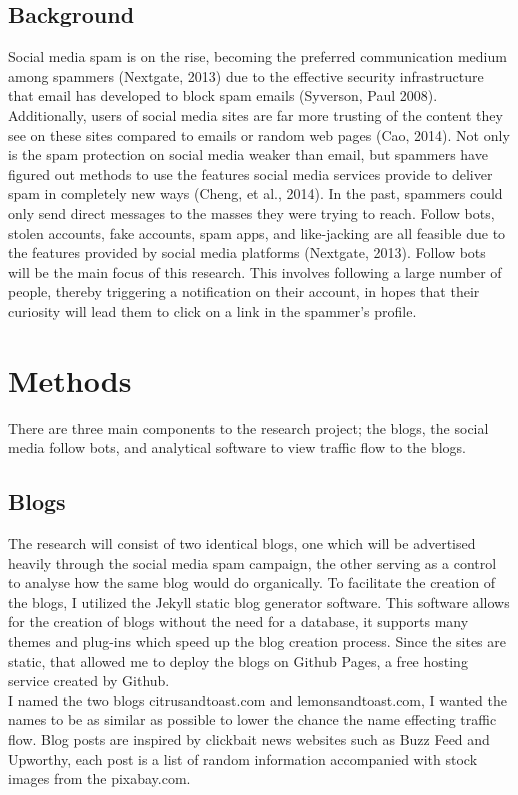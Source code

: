 \documentclass{article}
\begin{document}
\subsection{Background} Social media spam is on the rise, becoming the preferred communication medium among spammers (Nextgate, 2013) due to the effective security infrastructure that email has developed to block spam emails (Syverson, Paul 2008). Additionally, users of social media sites are far more trusting of the content they see on these sites compared to emails or random web pages (Cao, 2014). Not only is the spam protection on social media weaker than email, but spammers have figured out methods to use the features social media services provide to deliver spam in completely new ways (Cheng, et al., 2014). 
In the past, spammers could only send direct messages to the masses they were trying to reach.  Follow bots, stolen accounts, fake accounts, spam apps, and like-jacking are all feasible due to the features provided by social media platforms (Nextgate, 2013). Follow bots will be the main focus of this research. This involves following a large number of people, thereby triggering a notification on their account, in hopes that their curiosity will lead them to click on a link in the spammer’s profile. 

\section{Methods}

There are three main components to the research project; the blogs, the social media follow bots, and analytical software to view traffic flow to the blogs.
\subsection{Blogs}
The research will consist of two identical blogs, one which will be advertised heavily through the social media spam campaign, the other serving as a control to analyse how the same blog would do organically. To facilitate the creation of the blogs, I utilized the Jekyll static blog generator software. This software allows for the creation of blogs without the need for a database, it supports many themes and plug-ins which speed up the blog creation process. Since the sites are static, that allowed me to deploy the blogs on Github Pages, a free hosting service created by Github. 
\\
I named the two blogs citrusandtoast.com and lemonsandtoast.com, I wanted the names to be as similar as possible to lower the chance the name effecting traffic flow. Blog posts are inspired by clickbait news websites such as Buzz Feed and Upworthy, each post is a list of random information accompanied with stock images from the pixabay.com. 
\end{document}
